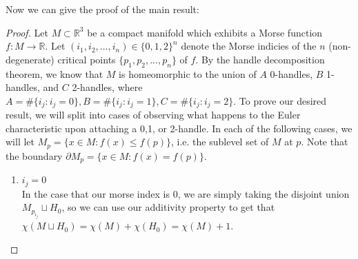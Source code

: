 \documentclass[12pt]{article}
\newcommand{\bR}{{\mathbb R}}
\theoremstyle{definition}
\begin{document}
Now we can give the proof of the main result:
\begin{proof}
      Let $M \subset \bR^3$ be a compact manifold which exhibits a Morse function $f:M \rightarrow \bR$. Let $(i_1,i_2,...,i_n)\in \{0,1,2\}^n$ denote the Morse indicies of the $n$ (non-degenerate) critical points $\{p_1,p_2,...,p_n\}$ of $f$. By the handle decomposition theorem, we know that $M$ is homeomorphic to the union of $A$ 0-handles, $B$ 1-handles, and $C$ 2-handles, where $A = \# \{i_j : i_j = 0\}, B = \# \{i_j : i_j = 1\}, C= \# \{i_j: i_j = 2\}$. To prove our desired result, we will split into cases of observing what happens to the Euler characteristic upon attaching a 0,1, or 2-handle. In each of the following cases, we will let $M_{p} = \{x \in M: f(x)\leq f(p)\}$, i.e. the sublevel set of $M$ at $p$. Note that the boundary $\partial M_{p} = \{x \in M : f(x) = f(p)\}$. 
      
      \begin{enumerate}
            \item $i_j = 0$\\
            In the case that our morse index is 0, we are simply taking the disjoint union $M_{p_{i_j}} \sqcup H_0$, so we can use our additivity property to get that $\chi(M \sqcup H_0) = \chi(M) + \chi(H_0) = \chi(M) + 1$. 


\end{enumerate}
\end{proof}
\end{document}

